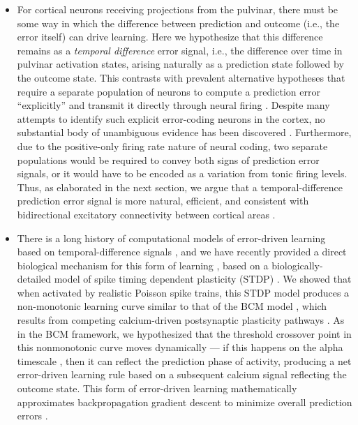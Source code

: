 \documentclass[11pt,twoside]{article}
\newif\myifpdf
\begin{document}
\begin{itemize}
	\item For cortical neurons receiving projections from the pulvinar, there must be some way in which the difference between prediction and outcome (i.e., the error itself) can drive learning.  Here we hypothesize that this difference remains as a \emph{temporal difference} error signal, i.e., the difference over time in pulvinar activation states, arising naturally as a prediction state followed by the outcome state.  This contrasts with prevalent alternative hypotheses that require a separate population of neurons to compute a prediction error ``explicitly'' and transmit it directly through neural firing \citep{RaoBallard99,KawatoHayakawaInui93,Friston05,Friston10,OudenKokLange12,LotterKreimanCox16}.  Despite many attempts to identify such explicit error-coding neurons in the cortex, no substantial body of unambiguous evidence has been discovered \citep{KokLange15,KokJeheedeLange12,SummerfieldEgner09,LeeMumford03,WalshMcGovernClarkEtAl20}.  Furthermore, due to the positive-only firing rate nature of neural coding, two separate populations would be required to convey both signs of prediction error signals, or it would have to be encoded as a variation from tonic firing levels.  Thus, as elaborated in the next section, we argue that a temporal-difference prediction error signal is more natural, efficient, and consistent with bidirectional excitatory connectivity between cortical areas \citep{RumelhartMcClelland82,Hopfield84,DesimoneDuncan95,ReynoldsChelazziDesimone99,MillerCohen01,OReillyWyatteHerdEtAl13}.  

	\item There is a long history of computational models of error-driven learning based on temporal-difference signals \citep{AckleyHintonSejnowski85,OReilly96,BengioMesnardFischerEtAl17,WhittingtonBogacz19,LillicrapSantoroMarrisEtAl20}, and we have recently provided a direct biological mechanism for this form of learning \citep{OReillyMunakataFrankEtAl12}, based on a biologically-detailed model of spike timing dependent plasticity (STDP) \citep{UrakuboHondaFroemkeEtAl08}.  We showed that when activated by realistic Poisson spike trains, this STDP model produces a non-monotonic learning curve similar to that of the BCM model \citep{BienenstockCooperMunro82}, which results from competing calcium-driven postsynaptic plasticity pathways \citep{ShouvalBearCooper02,CooperBear12}.  As in the BCM framework, we hypothesized that the threshold crossover point in this nonmonotonic curve moves dynamically --- if this happens on the alpha timescale \citep{LimMcKeeWoloszynEtAl15}, then it can reflect the prediction phase of activity, producing a net error-driven learning rule based on a subsequent calcium signal reflecting the outcome state.  This form of error-driven learning mathematically approximates backpropagation gradient descent to minimize overall prediction errors \citep{OReilly96}.
\end{itemize}
\end{document}
